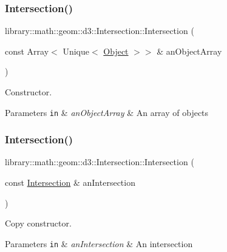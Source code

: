 \subsubsection{\texorpdfstring{Intersection()}{Intersection()}\hspace{0.1cm}{\footnotesize\ttfamily [1/2]}}
{\footnotesize\ttfamily library\+::math\+::geom\+::d3\+::\+Intersection\+::\+Intersection (\begin{DoxyParamCaption}\item[{const Array$<$ Unique$<$ \hyperlink{classlibrary_1_1math_1_1geom_1_1d3_1_1_object}{Object} $>$$>$ \&}]{an\+Object\+Array }\end{DoxyParamCaption})}



Constructor. 


\begin{DoxyParams}[1]{Parameters}
\mbox{\tt in}  & {\em an\+Object\+Array} & An array of objects \\
\hline
\end{DoxyParams}
\mbox{\label{classlibrary_1_1math_1_1geom_1_1d3_1_1_intersection_a6eacd360660163afafb78178d25ad714}} 
\subsubsection{\texorpdfstring{Intersection()}{Intersection()}\hspace{0.1cm}{\footnotesize\ttfamily [2/2]}}
{\footnotesize\ttfamily library\+::math\+::geom\+::d3\+::\+Intersection\+::\+Intersection (\begin{DoxyParamCaption}\item[{const \hyperlink{classlibrary_1_1math_1_1geom_1_1d3_1_1_intersection}{Intersection} \&}]{an\+Intersection }\end{DoxyParamCaption})}



Copy constructor. 


\begin{DoxyParams}[1]{Parameters}
\mbox{\tt in}  & {\em an\+Intersection} & An intersection \\
\hline
\end{DoxyParams}
\mbox{\label{classlibrary_1_1math_1_1geom_1_1d3_1_1_intersection_af2c13f6bc69d8271600d0f30848dd64b}} 
